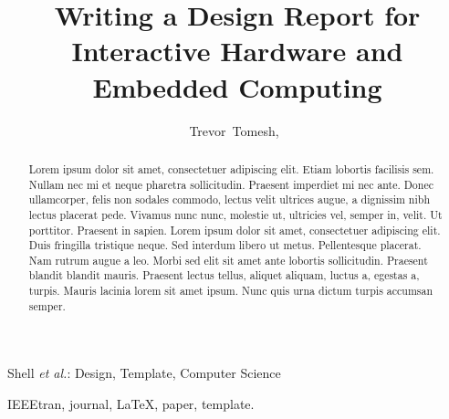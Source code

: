 \documentclass[journal]{IEEEtran}
\begin{document}

\title{Writing a Design Report for Interactive Hardware and Embedded Computing}


\author{Trevor~Tomesh,~
        }


%
{Shell \MakeLowercase{\textit{et al.}}: Design, Template, Computer Science }


\maketitle

\begin{abstract}
  

  Lorem ipsum dolor sit amet, consectetuer adipiscing elit. Etiam lobortis facilisis sem. Nullam nec mi et neque
  pharetra sollicitudin. Praesent imperdiet mi nec ante. Donec ullamcorper, felis non sodales commodo, lectus
  velit ultrices augue, a dignissim nibh lectus placerat pede. Vivamus nunc nunc, molestie ut, ultricies vel,
  semper in, velit. Ut porttitor. Praesent in sapien. Lorem ipsum dolor sit amet, consectetuer adipiscing elit.
  Duis fringilla tristique neque. Sed interdum libero ut metus. Pellentesque placerat. Nam rutrum augue a leo.
  Morbi sed elit sit amet ante lobortis sollicitudin. Praesent blandit blandit mauris. Praesent lectus tellus,
  aliquet aliquam, luctus a, egestas a, turpis. Mauris lacinia lorem sit amet ipsum. Nunc quis urna dictum
  turpis accumsan semper. \end{abstract}

\begin{IEEEkeywords}
IEEEtran, journal, \LaTeX, paper, template.
\end{IEEEkeywords}
\end{document}

